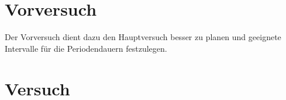 \documentclass[fleqn,10pt]{olplainarticle}
\begin{document}
\section{Vorversuch}
Der Vorversuch dient dazu den Hauptversuch besser zu planen und geeignete Intervalle für die Periodendauern festzulegen. 

\section{Versuch}
\end{document}
